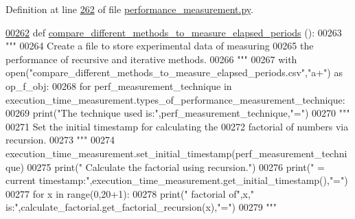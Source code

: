 Definition at line \hyperlink{performance__measurement_8py_source_l00262}{262} of file \hyperlink{performance__measurement_8py_source}{performance\+\_\+measurement.\+py}.


\begin{DoxyCode}
\hypertarget{classutilities_1_1timing__measurements_1_1performance__measurement_1_1execution__time__measurement_l00262}{}\hyperlink{classutilities_1_1timing__measurements_1_1performance__measurement_1_1execution__time__measurement_a9b05f1fd5acd56880daa42266dbf8284}{00262}     \textcolor{keyword}{def }\hyperlink{classutilities_1_1timing__measurements_1_1performance__measurement_1_1execution__time__measurement_a9b05f1fd5acd56880daa42266dbf8284}{compare\_different\_methods\_to\_measure\_elapsed\_periods}
      ():
00263         \textcolor{stringliteral}{"""}
00264 \textcolor{stringliteral}{            Create a file to store experimental data of measuring}
00265 \textcolor{stringliteral}{                the performance of recursive and iterative methods.}
00266 \textcolor{stringliteral}{        """}
00267         with open(\textcolor{stringliteral}{"compare\_different\_methods\_to\_measure\_elapsed\_periods.csv"},\textcolor{stringliteral}{"a+"}) \textcolor{keyword}{as} op\_f\_obj:
00268             \textcolor{keywordflow}{for} perf\_measurement\_technique \textcolor{keywordflow}{in} 
      execution\_time\_measurement.types\_of\_performance\_measurement\_technique:
00269                 print(\textcolor{stringliteral}{"The technique used is:"},perf\_measurement\_technique,\textcolor{stringliteral}{"="})
00270                 \textcolor{stringliteral}{"""}
00271 \textcolor{stringliteral}{                    Set the initial timestamp for calculating the}
00272 \textcolor{stringliteral}{                        factorial of numbers via recursion.}
00273 \textcolor{stringliteral}{                """}
00274                 execution\_time\_measurement.set\_initial\_timestamp(perf\_measurement\_technique)
00275                 print(\textcolor{stringliteral}{" Calculate the factorial using recursion."})
00276                 print(\textcolor{stringliteral}{" = current timestamp:"},execution\_time\_measurement.get\_initial\_timestamp(),\textcolor{stringliteral}{"="})
00277                 \textcolor{keywordflow}{for} x \textcolor{keywordflow}{in} range(0,20+1):
00278                     print(\textcolor{stringliteral}{"     factorial of"},x,\textcolor{stringliteral}{" is:"},calculate\_factorial.get\_factorial\_recursion(x),\textcolor{stringliteral}{"="})
00279                 \textcolor{stringliteral}{"""}

\end{DoxyCode}
